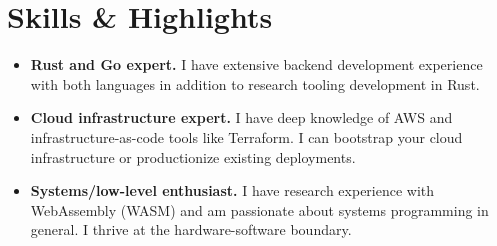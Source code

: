 \section{Skills \& Highlights}

\begin{itemize}[noitemsep, topsep=0pt]
    \item
        \textbf{Rust and Go expert.} I have extensive backend development experience with both languages in addition to research tooling development in Rust.
    \item
        \textbf{Cloud infrastructure expert.} I have deep knowledge of AWS and infrastructure-as-code tools like Terraform. I can bootstrap your cloud infrastructure or productionize existing deployments.
    \item
        \textbf{Systems/low-level enthusiast.} I have research experience with WebAssembly (WASM) and am passionate about systems programming in general. I thrive at the hardware-software boundary.
\end{itemize}
